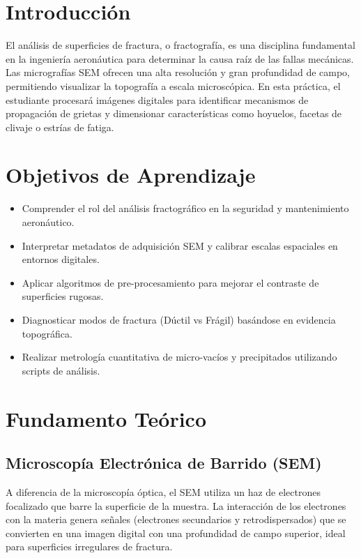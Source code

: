 \documentclass[11pt, a4paper]{article}
\begin{document}
\section{Introducción}
El análisis de superficies de fractura, o fractografía, es una disciplina fundamental en la ingeniería aeronáutica para determinar la causa raíz de las fallas mecánicas. Las micrografías SEM ofrecen una alta resolución y gran profundidad de campo, permitiendo visualizar la topografía a escala microscópica. En esta práctica, el estudiante procesará imágenes digitales para identificar mecanismos de propagación de grietas y dimensionar características como hoyuelos, facetas de clivaje o estrías de fatiga.

\section{Objetivos de Aprendizaje}
\begin{itemize}[label=-]
    \item Comprender el rol del análisis fractográfico en la seguridad y mantenimiento aeronáutico.
    \item Interpretar metadatos de adquisición SEM y calibrar escalas espaciales en entornos digitales.
    \item Aplicar algoritmos de pre-procesamiento para mejorar el contraste de superficies rugosas.
    \item Diagnosticar modos de fractura (Dúctil vs Frágil) basándose en evidencia topográfica.
    \item Realizar metrología cuantitativa de micro-vacíos y precipitados utilizando scripts de análisis.
\end{itemize}

\section{Fundamento Teórico}

\subsection{Microscopía Electrónica de Barrido (SEM)}
A diferencia de la microscopía óptica, el SEM utiliza un haz de electrones focalizado que barre la superficie de la muestra. La interacción de los electrones con la materia genera señales (electrones secundarios y retrodispersados) que se convierten en una imagen digital con una profundidad de campo superior, ideal para superficies irregulares de fractura.
\end{document}
